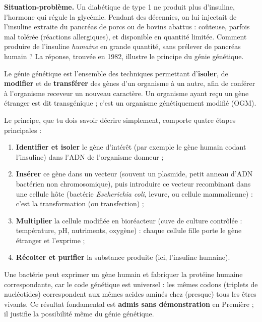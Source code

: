\documentclass[11pt]{article}
\newcommand{\cle}[1]{{\popxbold\color{popdark}#1}}
\newcounter{popsec}
\newcounter{popsub}
\newcommand{\courssub}[1]{%
  \stepcounter{popsub}%
  \par\vspace{9pt}\noindent{\popxbold\fontsize{11.5}{13}\selectfont\color{popink}{\color{poporange}\thepopsec.\thepopsub}\hspace{6pt}#1}\par\nopagebreak\vspace{4pt}
}
\begin{document}
\courssub{Le génie génétique : principe général}

\textbf{Situation-problème.} Un diabétique de type 1 ne produit plus d'insuline, l'hormone qui régule la glycémie. Pendant des décennies, on lui injectait de l'insuline extraite du pancréas de porcs ou de bovins abattus : coûteuse, parfois mal tolérée (réactions allergiques), et disponible en quantité limitée. Comment produire de l'insuline \emph{humaine} en grande quantité, sans prélever de pancréas humain ? La réponse, trouvée en 1982, illustre le principe du génie génétique.

\begin{definition}
Le \cle{génie génétique} est l'ensemble des techniques permettant d'\textbf{isoler}, de \textbf{modifier} et de \textbf{transférer} des \cle{gènes} d'un organisme à un autre, afin de conférer à l'organisme receveur un nouveau caractère. Un organisme ayant reçu un gène étranger est dit \cle{transgénique} ; c'est un \cle{organisme génétiquement modifié} (OGM).
\end{definition}

Le principe, que tu dois savoir décrire simplement, comporte quatre étapes principales :
\begin{enumerate}
\item \textbf{Identifier et isoler} le gène d'intérêt (par exemple le gène humain codant l'insuline) dans l'ADN de l'organisme donneur ;
\item \textbf{Insérer} ce gène dans un \cle{vecteur} (souvent un \cle{plasmide}, petit anneau d'ADN bactérien non chromosomique), puis introduire ce vecteur recombinant dans une cellule hôte (bactérie \emph{Escherichia coli}, levure, ou cellule mammalienne) : c'est la \cle{transformation} (ou transfection) ;
\item \textbf{Multiplier} la cellule modifiée en \cle{bioréacteur} (cuve de culture contrôlée : température, pH, nutriments, oxygène) : chaque cellule fille porte le gène étranger et l'exprime ;
\item \textbf{Récolter et purifier} la substance produite (ici, l'insuline humaine).
\end{enumerate}

\begin{propriete}
Une bactérie peut exprimer un gène humain et fabriquer la protéine humaine correspondante, car le \cle{code génétique est universel} : les mêmes codons (triplets de nucléotides) correspondent aux mêmes acides aminés chez (presque) tous les êtres vivants. Ce résultat fondamental est \textbf{admis sans démonstration} en Première ; il justifie la possibilité même du génie génétique.
\end{propriete}
\end{document}
